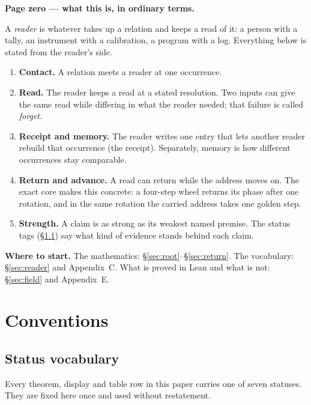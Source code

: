 \documentclass[11pt,a4paper]{article}
\theoremstyle{plain}
\theoremstyle{definition}
\theoremstyle{remark}
\begin{document}
\vspace{4pt}
\begin{pagezero}
\textbf{Page zero --- what this is, in ordinary terms.}\par\smallskip
A \emph{reader} is whatever takes up a relation and keeps a read of it: a person with a tally, an instrument with a calibration, a program with a log. Everything below is stated from the reader's side.
\begin{enumerate}[leftmargin=1.6em]
\item \textbf{Contact.} A relation meets a reader at one occurrence.
\item \textbf{Read.} The reader keeps a read at a stated resolution. Two inputs can give the same read while differing in what the reader needed; that failure is called \emph{forget}.
\item \textbf{Receipt and memory.} The reader writes one entry that lets another reader rebuild that occurrence (the receipt). Separately, memory is how different occurrences stay comparable.
\item \textbf{Return and advance.} A read can return while the address moves on. The exact core makes this concrete: a four-step wheel returns its phase after one rotation, and in the same rotation the carried address takes one golden step.
\item \textbf{Strength.} A claim is as strong as its weakest named premise. The status tags (\S\ref{sec:status}) say what kind of evidence stands behind each claim.
\end{enumerate}
\textbf{Where to start.} The mathematics: \S\ref{sec:root}--\S\ref{sec:return}. The vocabulary: \S\ref{sec:reader} and Appendix~C. What is proved in Lean and what is not: \S\ref{sec:field} and Appendix~E.
\end{pagezero}

\clearpage
\tableofcontents
\clearpage
{}
\section{Conventions}\label{sec:conv}

\subsection{Status vocabulary}\label{sec:status}
Every theorem, display and table row in this paper carries one of seven statuses. They are fixed here once and used without restatement.
\end{document}

